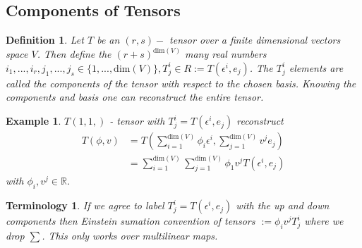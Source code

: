 \documentclass[10pt, oneside]{article}
\newcommand{\R}{\mathbb{R}}
\newtheorem{defn}{Definition}
\newtheorem{example}{Example}
\newtheorem{Terminology}{Terminology}
\begin{document}
      \subsection*{Components of Tensors}
         \begin{defn}
            Let $T$ be an $(r,s) - $ tensor over a finite dimensional vectors space $V$. Then define the $(r+s)^{\text{dim}(V)}$ many real numbers $i_1,...,i_r, j_1,...,j_s \in \{1,...,\text{dim}(V)\}, T^i_j \in R := T(\epsilon^i,e_j)$. The $T^i_j$ elements are called the components of the tensor with respect to the chosen basis.
            Knowing the components and basis one can reconstruct the entire tensor.
         \end{defn}
         \begin{example}
            $T (1,1,)$ - tensor with $T^i_j = T(\epsilon^i,e_j)$ reconstruct 
            \begin{align*}
               T(\phi,v) &= T(\sum_{i=1}^{\text{dim}(V)}\phi_i \epsilon^i, \sum_{j=1}^{\text{dim}(V)}v^j e_j) \\
               &=\sum_{i=1}^{\text{dim}(V)}\sum_{j=1}^{\text{dim}(V)} \phi_1 v^j T(\epsilon^i,e_j)
            \end{align*} 
            with $\phi_i, v^j \in \R$.
         \end{example}
         \begin{Terminology}
            If we agree to label $T^i_j = T(\epsilon^i,e_j)$ with the up and down components then Einstein sumation convention of tensors $:= \phi_i v^j T^i_j$ where we drop $\sum$. This only works over multilinear maps. 
         \end{Terminology}
\end{document}
